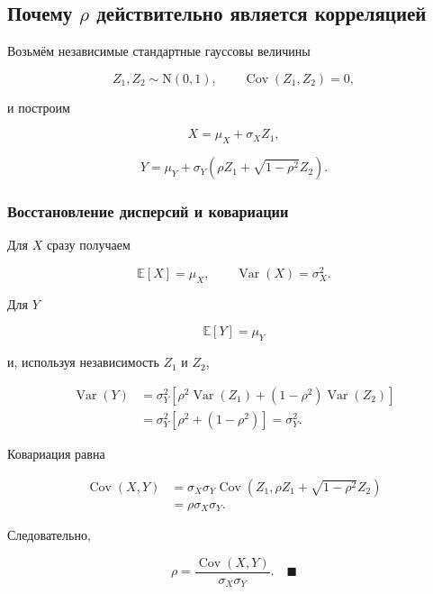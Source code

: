 \documentclass[
  russian,
  12pt,
  a4paper,
  a4paper,
  openany]{scrbook}
\begin{document}
\subsection{\texorpdfstring{Почему \(\rho\) действительно является
корреляцией}{Почему \textbackslash rho действительно является корреляцией}}\label{ux43fux43eux447ux435ux43cux443-rho-ux434ux435ux439ux441ux442ux432ux438ux442ux435ux43bux44cux43dux43e-ux44fux432ux43bux44fux435ux442ux441ux44f-ux43aux43eux440ux440ux435ux43bux44fux446ux438ux435ux439}

Возьмём независимые стандартные гауссовы величины

\[
Z_1,Z_2\sim\mathrm N(0,1),
\qquad
\operatorname{Cov}(Z_1,Z_2)=0,
\]

и построим

\[
X=\mu_X+\sigma_XZ_1,
\]

\[
Y=\mu_Y+\sigma_Y\left(\rho Z_1+\sqrt{1-\rho^2}Z_2\right).
\]

\begin{bookderivation}

\subsubsection{Восстановление дисперсий и
ковариации}\label{ux432ux43eux441ux441ux442ux430ux43dux43eux432ux43bux435ux43dux438ux435-ux434ux438ux441ux43fux435ux440ux441ux438ux439-ux438-ux43aux43eux432ux430ux440ux438ux430ux446ux438ux438}

Для \(X\) сразу получаем

\[
\mathbb E[X]=\mu_X,
\qquad
\operatorname{Var}(X)=\sigma_X^2.
\]

Для \(Y\)

\[
\mathbb E[Y]=\mu_Y
\]

и, используя независимость \(Z_1\) и \(Z_2\),

\[
\begin{aligned}
\operatorname{Var}(Y)
&=\sigma_Y^2\left[
\rho^2\operatorname{Var}(Z_1)
+(1-\rho^2)\operatorname{Var}(Z_2)
\right]\\
&=\sigma_Y^2[\rho^2+(1-\rho^2)]
=\sigma_Y^2.
\end{aligned}
\]

Ковариация равна

\[
\begin{aligned}
\operatorname{Cov}(X,Y)
&=\sigma_X\sigma_Y
\operatorname{Cov}\!\left(
Z_1,
\rho Z_1+\sqrt{1-\rho^2}Z_2
\right)\\
&=\rho\sigma_X\sigma_Y.
\end{aligned}
\]

Следовательно,

\[
\boxed{
\rho=
\frac{\operatorname{Cov}(X,Y)}{\sigma_X\sigma_Y}.
}
\quad\blacksquare
\]

\end{bookderivation}
\end{document}
